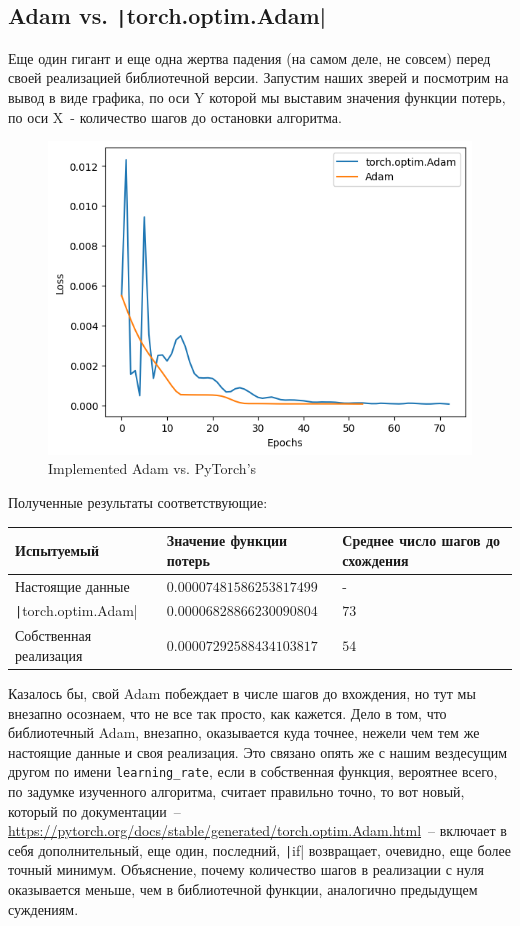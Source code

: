 \documentclass[12pt, a4paper, oneside, final]{article}
\begin{document}
	\subsection*{Adam vs. \texttt|torch.optim.Adam|}
	Еще один гигант и еще одна жертва падения (на самом деле, не совсем) перед своей реализацией библиотечной версии.
	Запустим наших зверей и посмотрим на вывод в виде графика, по оси Y которой мы выставим значения функции потерь, по оси X~- количество шагов до остановки алгоритма.
	\begin{figure}[H]
		\centering
		\includegraphics[scale = 1]{Image/T1_ADAM_vs_torch_optim_ADAM.png}
		\caption*{Implemented Adam vs. PyTorch's}
	\end{figure}
	Полученные результаты соответствующие:
	\begin{table}[H]
		\centering
		\begin{tabular}{l|l|l}
			Испытуемый & Значение функции потерь & Среднее число шагов до схождения \\ \hline
			Настоящие данные & $0.00007481586253817499$ & - \\
			\texttt|torch.optim.Adam| & $0.00006828866230090804$ & $73$ \\
			Собственная реализация & $0.00007292588434103817$ & $54$
		\end{tabular}
	\end{table}
	Казалось бы, свой Adam побеждает в числе шагов до вхождения, но тут мы внезапно осознаем, что не все так просто, как кажется.
	Дело в том, что библиотечный Adam, внезапно, оказывается куда точнее, нежели чем тем же настоящие данные и своя реализация.
	Это связано опять же с нашим вездесущим другом по имени \texttt{learning\_rate}, если в собственная функция, вероятнее всего, по задумке изученного алгоритма, считает правильно точно, то вот новый, который по документации~-- \url{https://pytorch.org/docs/stable/generated/torch.optim.Adam.html}~-- включает в себя дополнительный, еще один, последний, \texttt|if| возвращает, очевидно, еще более точный минимум.
	Объяснение, почему количество шагов в реализации с нуля оказывается меньше, чем в библиотечной функции, аналогично предыдущем суждениям.
\end{document}
